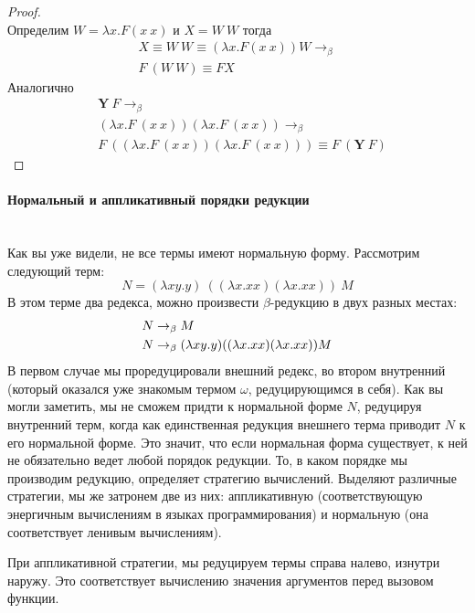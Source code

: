 \documentclass[lambda.tex]{subfiles}
\begin{document}
\begin{proof}~\\
Определим $W = \lambda x.F(x\ x)$ и $X = W\ W$ тогда
\begin{align*}
	X \equiv W\ W \equiv (\lambda x.F(x\ x))W \rightarrow_\beta\\
	F\ (W\ W) \equiv F X
\end{align*}
Аналогично
\begin{align*}
	&\boldsymbol{Y}\ F \rightarrow_\beta\\
	&(\lambda x.F\ (x\ x)) (\lambda x.F\ (x\ x)) \rightarrow_\beta\\
	&F\ ((\lambda x.F\ (x\ x)) (\lambda x.F\ (x\ x))) \equiv F\ (\boldsymbol{Y}\ F)
\end{align*}
\end{proof}

\newpage
\paragraph{Нормальный и аппликативный порядки редукции} %
\label{par:lazy and energic reduction}~\\

Как вы уже видели, не все термы имеют нормальную форму. Рассмотрим следующий терм:
\begin{equation*}
	N = (\lambda x y.y)\ ((\lambda x.xx)(\lambda x.xx))\ M
\end{equation*}
В этом терме два редекса, можно произвести $\beta$-редукцию в двух разных местах:
\begin{align*}
	N &\rightarrow_\beta M\\
	N &\rightarrow_\beta (\lambda x y.y) ((\lambda x.xx)(\lambda x.xx)) M
\end{align*}
В первом случае мы проредуцировали внешний редекс, во втором внутренний (который оказался уже знакомым термом $\omega$, редуцирующимся в себя). Как вы могли заметить, мы не сможем придти к нормальной форме $N$, редуцируя внутренний терм, когда как единственная редукция внешнего терма приводит $N$ к его нормальной форме. Это значит, что если нормальная форма существует, к ней не обязательно ведет любой порядок редукции. То, в каком порядке мы производим редукцию, определяет стратегию вычислений. Выделяют различные стратегии, мы же затронем две из них: аппликативную (соответствующую энергичным вычислениям в языках программирования) и нормальную (она соответствует ленивым вычислениям).

При аппликативной стратегии, мы редуцируем термы справа налево, изнутри наружу. Это соответствует вычислению значения аргументов перед вызовом функции.
\end{document}
